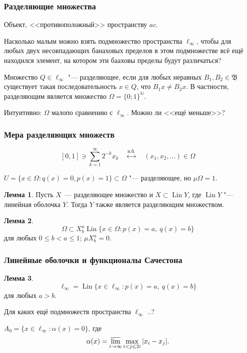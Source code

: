 \documentclass[10pt,pdf,hyperref={unicode},aspectratio=169,color={usenames, dvipsnames}]{beamer}\usepackage{amsmath}
\theoremstyle{definition}
\newtheorem{llemma}{Лемма}
\begin{document}
\begin{frame}\frametitle{Разделяющие множества}
	Объект, <<противоположный>> пространству $ac$.

	Насколько малым можно взять подмножество пространства $\ell_\infty$,
	чтобы для любых двух несовпадающих банаховых пределов в этом подмножестве всё ещё находился элемент,
	на котором эти бааховы пределы будут различаться?

	Множество $Q\in\ell_\infty$ "--- разделяющее, если
	для любых неравных $B_1, B_2\in\mathfrak{B}$ существует такая последовательность $x\in Q$,
	что $B_1 x \neq B_2 x$.
	В частности, разделяющим является множество $\Omega = \{0;1\}^\mathbb{N}$.

	Интуитивно: $\Omega$ малопо сравнению с $\ell_\infty$. Можно ли <<ещё меньше>>?
\end{frame}

\begin{frame}\frametitle{Мера разделяющих множеств}

	\begin{equation}\label{eq:bijection_omega_0_1}
		[0,1] \ni \sum_{k=1}^\infty 2^{-k} x_k
		\quad
		\stackrel{\text{п.б.}}{\leftrightarrow}
		\quad
		(x_1, x_2, \dots)\in \Omega
	\end{equation}

	$U = \{ x\in\Omega: q(x) = 0, p(x) = 1 \} \subset\Omega$ "--- разделяющее,
	но $\mu \Omega = 1$.

	\begin{llemma}
		Пусть $X$~--- разделяющее множество и $X \subset \operatorname{Lin} Y$,
		где $\operatorname{Lin} Y$ "--- линейная оболочка $Y$.
		Тогда $Y$ также является разделяющим множеством.
	\end{llemma}

	\begin{llemma}
		\begin{equation}
			\Omega \subset X_b^a\operatorname{Lin}\{x\in\Omega : p(x) = a,~ q(x) = b\}
		\end{equation}
		для любых $0\leq b < a \leq 1$; $\mu X_b^a = 0$.
	\end{llemma}


\end{frame}

\begin{frame}\frametitle{Линейные оболочки и функционалы Сачестона}

	\begin{llemma}
		\begin{equation}
			\ell_\infty = \operatorname{Lin}\{x\in\ell_\infty : p(x) = a,~ q(x) = b\}
		\end{equation}
		для любых $a>b$.
	\end{llemma}
	\vspace{1em}

	Для каких ещё подмножеств пространства $\ell_\infty$ ..?

	$A_0 = \{ x \in \ell_\infty : \alpha(x) =0 \}$,
	где~\cite{our-vzms-2018}
	\begin{equation*}
		\alpha(x) = \varlimsup_{i\to\infty} \max_{i<j\leqslant 2i} |x_i - x_j|
		.
	\end{equation*}


\end{frame}
\end{document}
